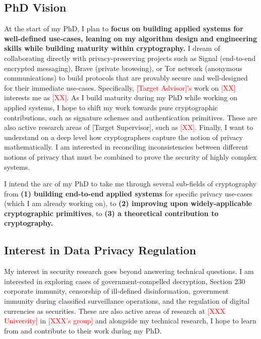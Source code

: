 \documentclass{article}
\newcommand{\TODO}[1]{\textcolor{red}{#1}}
\newcommand{\aftersep}{\vspace{-0.3cm}}
\newcommand{\beforesep}{\vspace{-0.2cm}}
\begin{document}
\aftersep
\subsection*{PhD Vision}
\beforesep

At the start of my PhD, I plan to \textbf{focus on building applied systems for well-defined use-cases, leaning on my algorithm design and engineering skills while building maturity within cryptography.} I dream of collaborating directly with privacy-preserving projects such as Signal (end-to-end encrypted messaging), Brave (private browsing), or Tor network (anonymous communications) to build protocols that are provably secure and well-designed for their immediate use-cases. Specifically, \TODO{[Target Advisor]’s} work on \TODO{[XX]} interests me as \TODO{[XX]}. As I build maturity during my PhD while working on applied systems, I hope to shift my work towards pure cryptographic contributions, such as signature schemes and authentication primitives. These are also active research areas of [Target Supervisor], such as \TODO{[XX]}. Finally, I want to understand on a deep level how cryptographers capture the notion of privacy mathematically. I am interested in reconciling inconsistencies between different notions of privacy that must be combined to prove the security of highly complex systems.

I intend the arc of my PhD to take me through several sub-fields of cryptography from \textbf{(1) building end-to-end applied systems} for specific privacy use-cases (which I am already working on), to \textbf{(2) improving upon widely-applicable cryptographic primitives}, to \textbf{(3) a theoretical contribution to cryptography.}

\aftersep
\subsection*{Interest in Data Privacy Regulation}
\beforesep

My interest in security research goes beyond answering technical questions. I am interested in exploring cases of government-compelled decryption, Section 230 corporate immunity, censorship of ill-defined disinformation, government immunity during classified surveillance operations, and the regulation of digital currencies as securities. These are also active areas of research at \TODO{[XXX University]} in \TODO{[XXX’s group]} and alongside my technical research, I hope to learn from and contribute to their work during my PhD.
\end{document}
